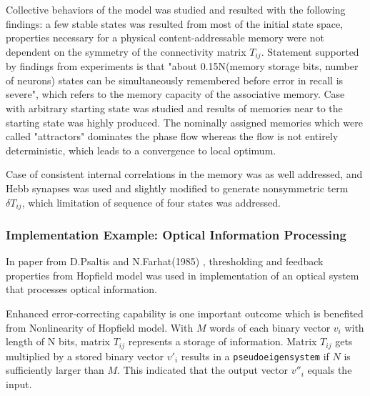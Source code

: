 \documentclass[12pt, a4paper]{article}
\begin{document}
Collective behaviors of the model was studied and resulted with the following findings: a few stable states was resulted from most of the initial state space, properties necessary for a physical content-addressable memory were not dependent on the symmetry of the connectivity matrix $T_{ij}$. Statement supported by findings from experiments is that "about 0.15N(memory storage bits, number of neurons) states can be simultaneously remembered before error in recall is severe", which refers to the memory capacity of the associative memory. Case with arbitrary starting state was studied and results of memories near to the starting state was highly produced. The nominally assigned memories which were called "attractors" dominates the phase flow whereas the flow is not entirely deterministic, which leads to a convergence to local optimum.

Case of consistent internal correlations in the memory was as well addressed, and Hebb synapses was used and slightly modified to generate nonsymmetric term~$\delta T_{ij}$, which limitation of sequence of four states was addressed.

\subsubsection{Implementation Example: Optical Information Processing}
In paper from D.Psaltis and N.Farhat(1985) \cite{optical_processing}, thresholding and feedback properties from Hopfield model was used in implementation of an optical system that processes optical information.

Enhanced error-correcting capability is one important outcome which is benefited from Nonlinearity of Hopfield model. With $M$ words of each binary vector $v_i$ with length of N bits, matrix $T_{ij}$ represents a storage of information. Matrix $T_{ij}$ gets multiplied by a stored binary vector $v'_i$ results in a \texttt{pseudoeigensystem} if $N$ is sufficiently larger than $M$. This indicated that the output vector $v''_i$ equals the input.
\end{document}
